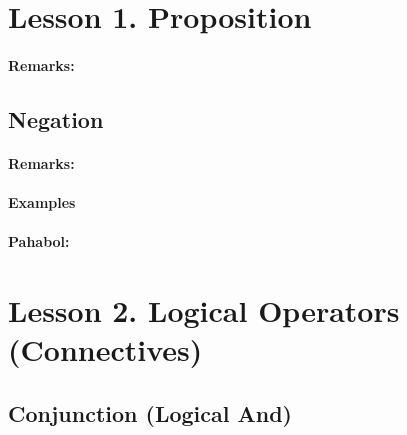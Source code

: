 \documentclass[]{book}
\let\oldparagraph\paragraph
\renewcommand{\paragraph}[1]{\oldparagraph{#1}\mbox{}}
\theoremstyle{definition}
\theoremstyle{definition}
\theoremstyle{definition}
\theoremstyle{remark}
\begin{document}
\hypertarget{lesson-1.-proposition}{%
\section*{Lesson 1. Proposition}\label{lesson-1.-proposition}}

\hypertarget{remarks-2}{%
\paragraph{Remarks:}\label{remarks-2}}

\hypertarget{negation}{%
\subsection*{Negation}\label{negation}}

\hypertarget{remarks-3}{%
\paragraph{Remarks:}\label{remarks-3}}

\hypertarget{examples-1}{%
\paragraph{Examples}\label{examples-1}}

\hypertarget{pahabol}{%
\paragraph{Pahabol:}\label{pahabol}}

\hypertarget{lesson-2.-logical-operators-connectives}{%
\section*{Lesson 2. Logical Operators (Connectives)}\label{lesson-2.-logical-operators-connectives}}

\hypertarget{conjunction-logical-and}{%
\subsection*{Conjunction (Logical And)}\label{conjunction-logical-and}}
\end{document}
